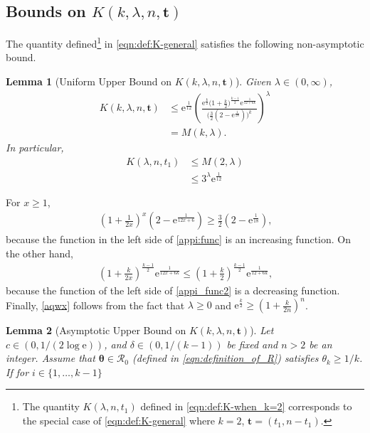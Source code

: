 \documentclass[journal, 10pt]{IEEEtran}
\newcommand{\rme}{\mathrm{e}}
\newcommand{\cR}{\mathcal{R}}
\theoremstyle{plain}
\theoremstyle{plain}
\newtheorem{lem}{Lemma}%
\theoremstyle{plain}
\theoremstyle{plain}
\newcommand{\boldtheta}{\mathbold{\theta}}
\newcommand{\boldt}{\mathbold{t}}
\begin{document}
\begin{appendices}
\section{Bounds on $K(k,\lambda, n, \boldt )$} \label{appdx:bounds on K}
The quantity defined\footnote{The quantity $K(\lambda, n, t_1)$ defined in \eqref{eqn:def:K-when_k=2} corresponds to the special case of \eqref{eqn:def:K-general} where $k=2$, $\boldt=(t_1, n-t_1)$.} in \eqref{eqn:def:K-general} satisfies the following non-asymptotic bound.
\begin{lem}[Uniform Upper Bound on $K(k,\lambda, n, \boldt )$]	\label{lem:unif_upp_bd_on_K}
Given $\lambda\in (0,  \infty)$,
\begin{align}
K(k,\lambda, n, \boldt )&\le \rme^\frac{1}{12}\left( \frac{ \rme^{\frac{k}{2}}\big( 1+\frac{k}{2} \big)^{\frac{k-1}{2}} \rme^\frac{1}{12+6k}      }{\big( \frac{3}{2} ( 2-\rme^\frac{1}{18} )\big)^k } \right)^\lambda \label{aqwx} \\
&=M(k, \lambda)\text{.}
\end{align}
In particular,
\begin{align}
K(\lambda, n, t_1) &\le 	M(2, \lambda) \\
&\le 3^\lambda\rme^\frac{1}{12} \label{eqn:M(2, lambda)le}
\end{align}
\end{lem}
\begin{IEEEproof}
For $x\ge 1$,
\begin{align}
\left( 1+\frac{1}{2x} \right)^{x}  \left( 2-\rme^{\frac{1}{12x+6}} \right) \ge \frac{3}{2}\left(2- \rme^{\frac{1}{18}} \right)\text{,} \label{appi:func}
\end{align}
because the function in the left side of \eqref{appi:func} is an increasing function. On the other hand,
\begin{align}
\left( 1+\frac{k}{2x} \right)^{\frac{k-1}{2}}\rme^{\frac{1}{12x+6k}}\le \left(1+\frac{k}{2} \right)^\frac{k-1}{2}\rme^\frac{1}{12+6k}\text{,} \label{appi_func2}
\end{align}
because the function of the left side of \eqref{appi_func2} is a decreasing function. Finally, \eqref{aqwx} follows from the fact that $\lambda \ge 0 $ and $\rme^\frac{k}{2}  \ge \left( 1+\frac{k}{2n} \right)^{n}$. 
\end{IEEEproof}
%
\begin{lem}[Asymptotic Upper Bound on $K(k, \lambda, n, \boldt )$] \label{lem:limit_of_K}
Let $c \in (0, 1/(2\log \rme ) ) $, and $\delta\in(0,1/(k-1)) $ be fixed and $n>2$ be an integer. Assume that $\boldtheta\in \cR_0 $ (defined in \eqref{eqn:definition_of_R}) satisfies $\theta_k \ge 1/k$. If for $i\in \{1,\hdots, k-1 \}$

\end{lem}
\end{appendices}
\end{document}
